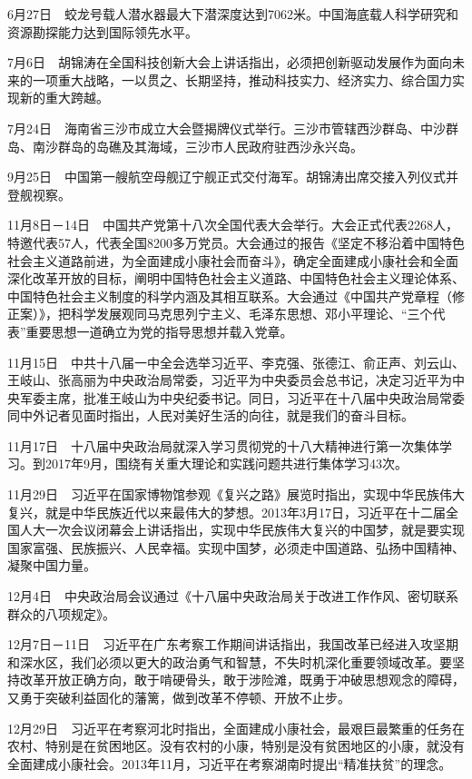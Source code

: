 \documentclass[10pt,a4paper,twocolumn]{book}
\begin{document}
6月27日　蛟龙号载人潜水器最大下潜深度达到7062米。中国海底载人科学研究和资源勘探能力达到国际领先水平。

7月6日　胡锦涛在全国科技创新大会上讲话指出，必须把创新驱动发展作为面向未来的一项重大战略，一以贯之、长期坚持，推动科技实力、经济实力、综合国力实现新的重大跨越。

7月24日　海南省三沙市成立大会暨揭牌仪式举行。三沙市管辖西沙群岛、中沙群岛、南沙群岛的岛礁及其海域，三沙市人民政府驻西沙永兴岛。

9月25日　中国第一艘航空母舰辽宁舰正式交付海军。胡锦涛出席交接入列仪式并登舰视察。

11月8日－14日　中国共产党第十八次全国代表大会举行。大会正式代表2268人，特邀代表57人，代表全国8200多万党员。大会通过的报告《坚定不移沿着中国特色社会主义道路前进，为全面建成小康社会而奋斗》，确定全面建成小康社会和全面深化改革开放的目标，阐明中国特色社会主义道路、中国特色社会主义理论体系、中国特色社会主义制度的科学内涵及其相互联系。大会通过《中国共产党章程（修正案）》，把科学发展观同马克思列宁主义、毛泽东思想、邓小平理论、“三个代表”重要思想一道确立为党的指导思想并载入党章。

11月15日　中共十八届一中全会选举习近平、李克强、张德江、俞正声、刘云山、王岐山、张高丽为中央政治局常委，习近平为中央委员会总书记，决定习近平为中央军委主席，批准王岐山为中央纪委书记。同日，习近平在十八届中央政治局常委同中外记者见面时指出，人民对美好生活的向往，就是我们的奋斗目标。

11月17日　十八届中央政治局就深入学习贯彻党的十八大精神进行第一次集体学习。到2017年9月，围绕有关重大理论和实践问题共进行集体学习43次。

11月29日　习近平在国家博物馆参观《复兴之路》展览时指出，实现中华民族伟大复兴，就是中华民族近代以来最伟大的梦想。2013年3月17日，习近平在十二届全国人大一次会议闭幕会上讲话指出，实现中华民族伟大复兴的中国梦，就是要实现国家富强、民族振兴、人民幸福。实现中国梦，必须走中国道路、弘扬中国精神、凝聚中国力量。

12月4日　中央政治局会议通过《十八届中央政治局关于改进工作作风、密切联系群众的八项规定》。

12月7日－11日　习近平在广东考察工作期间讲话指出，我国改革已经进入攻坚期和深水区，我们必须以更大的政治勇气和智慧，不失时机深化重要领域改革。要坚持改革开放正确方向，敢于啃硬骨头，敢于涉险滩，既勇于冲破思想观念的障碍，又勇于突破利益固化的藩篱，做到改革不停顿、开放不止步。

12月29日　习近平在考察河北时指出，全面建成小康社会，最艰巨最繁重的任务在农村、特别是在贫困地区。没有农村的小康，特别是没有贫困地区的小康，就没有全面建成小康社会。2013年11月，习近平在考察湖南时提出“精准扶贫”的理念。
\end{document}
